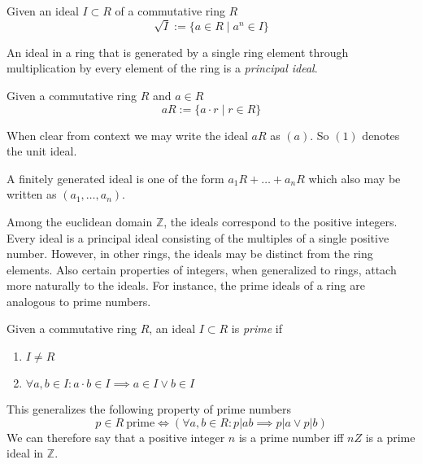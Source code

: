 \begin{definition}
   Given an ideal \(I \subset R\) of a commutative ring \(R\)
   \[\sqrt{I} := \{a \in R \mid a^n \in I\}\]
\end{definition}
An ideal in a ring that is generated by a single ring element through multiplication by every element of the ring is a \emph{principal ideal}.
\begin{definition}
   Given a commutative ring \(R\) and \(a \in R\)
   \[aR := \{a \cdot r \mid r \in R\}\]
\end{definition}
\begin{remark}[Notation]
   When clear from context we may write the ideal \(aR\) as \((a)\).
   So \((1)\) denotes the unit ideal.

   A finitely generated ideal is one of the form \(a_1R + \ldots + a_nR\) which also may be written as \((a_1, \ldots, a_n)\).
\end{remark}
Among the euclidean domain \(\mathbb{Z}\), the ideals correspond to the positive integers.
Every ideal is a principal ideal consisting of the multiples of a single positive number.
However, in other rings, the ideals may be distinct from the ring elements.
Also certain properties of integers, when generalized to rings, attach more naturally to the ideals.
For instance, the prime ideals of a ring are analogous to prime numbers.
\begin{definition}
   Given a commutative ring \(R\), an ideal \(I \subset R\) is \emph{prime} if
   \begin{enumerate}[label=\roman*, align=Center]
      \item \(I \neq R\)
      \item \(\forall a, b \in I: a \cdot b \in I \implies a \in I \lor b \in I\)
   \end{enumerate}
\end{definition}
\begin{remark}
   This generalizes the following property of prime numbers
   \[p \in R~\text{prime} \iff (\forall a,b \in R: p | ab \implies p | a \lor p | b)\]
   We can therefore say that a positive integer \(n\) is a prime number iff \(nZ\) is a prime ideal in \(\mathbb{Z}\).
\end{remark}

